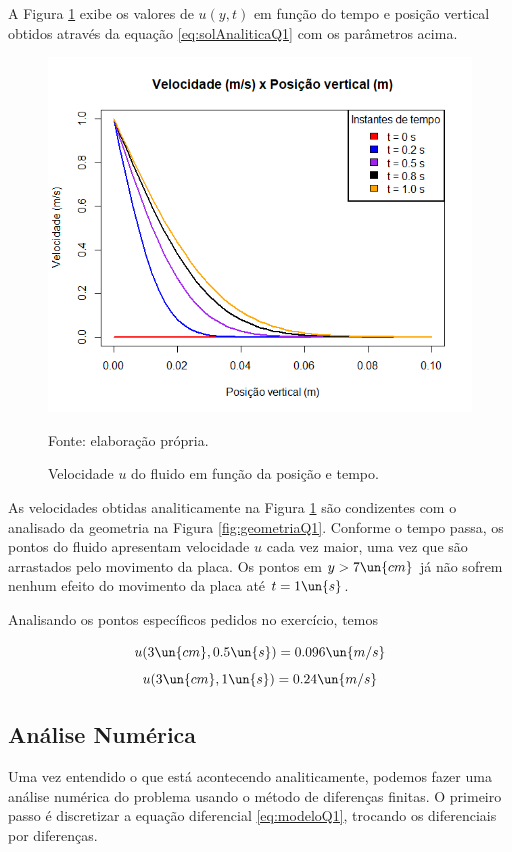 A Figura \ref*{fig:velocidadesAnaliticaQ1}
exibe os valores de $u(y,t)$ em função do tempo e posição vertical obtidos através da equação
\eqref{eq:solAnaliticaQ1} com os parâmetros acima.

\begin{figure}[h!]
    \caption{Velocidade $u$ do fluido em função da posição e tempo.}
    \label{fig:velocidadesAnaliticaQ1}
    \centering
    \centerline{\includegraphics[scale=0.5]{velocidadesAnaltico.png}}
    \par{Fonte: elaboração própria.}
\end{figure}

As velocidades obtidas analiticamente na Figura \ref*{fig:velocidadesAnaliticaQ1} são condizentes
com o analisado da geometria na Figura \ref*{fig:geometriaQ1}. Conforme o tempo passa,
os pontos do fluido apresentam velocidade $u$ cada vez maior, uma vez que são arrastados
pelo movimento da placa. Os pontos em $y > 7 \un{cm}$ já não sofrem nenhum efeito
do movimento da placa até $t = 1 \un{s}$.

Analisando os pontos específicos pedidos no exercício, temos

\[ u(3 \un{cm}, 0.5 \un{s}) = 0.096 \un{m/s} \]
\[ u(3 \un{cm}, 1 \un{s}) = 0.24 \un{m/s} \]

\subsection{Análise Numérica}

Uma vez entendido o que está acontecendo analiticamente, podemos fazer uma análise
numérica do problema usando o método de diferenças finitas. O primeiro passo
é discretizar a equação diferencial \eqref{eq:modeloQ1}, trocando os diferenciais
por diferenças.

